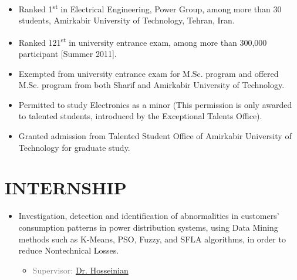 \begin{itemize}
\item Ranked 1\textsuperscript{st} in Electrical Engineering, Power Group, among more than 30 students,
Amirkabir University of Technology, Tehran, Iran.

\item Ranked 121\textsuperscript{st} in university entrance exam, among more than 300,000
participant [Summer 2011].

\item Exempted from university entrance exam for M.Sc. program and offered M.Sc. program from both
Sharif and Amirkabir University of Technology.

\item Permitted to study Electronics as a minor (This permission is only awarded to talented students, introduced by the Exceptional Talents Office).

\item Granted admission from Talented Student Office of Amirkabir University of Technology for graduate study. \\
\end{itemize}

\vspace{-1 em}
\section{INTERNSHIP}
\begin{itemize}
\item Investigation, detection and identification of abnormalities in customers' consumption patterns in power distribution systems, using Data Mining methods such as K-Means, PSO, Fuzzy, and SFLA algorithms, in order to reduce Nontechnical Losses.
\begin{itemize} 
\item\textcolor{gray}{Supervisor: \href{http://www.aut.ac.ir/official/main.asp?uid=hosseinian}{Dr. Hosseinian}} 
\end{itemize}
\end{itemize}

